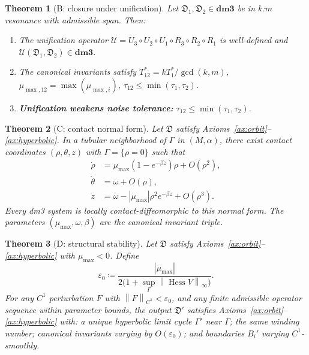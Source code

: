 \documentclass[12pt, oneside]{book}
\theoremstyle{plain}
\newtheorem{theorem}{Theorem}[section]
\theoremstyle{definition}
\theoremstyle{remark}
\newcommand{\dm}{\mathfrak{D}}
\newcommand{\dmcat}{\mathbf{dm3}}
\newcommand{\Orb}{\Gamma}
\newcommand{\cU}{\mathcal{U}}
\newcommand{\norm}[1]{\left\|#1\right\|}
\newcommand{\abs}[1]{\left|#1\right|}
\DeclareMathOperator{\Hess}{Hess}
\begin{document}
\begin{theorem}[B: closure under unification]\label{thm:B}
Let $\dm_1,\dm_2\in\dmcat$ be in $k$:$m$ resonance with admissible span.
Then:
\begin{enumerate}[label=\textup{(\roman*)}]
  \item The unification operator $\cU=U_3\circ U_2\circ U_1\circ R_3\circ R_2\circ R_1$
        is well-defined and $\cU(\dm_1,\dm_2)\in\dmcat$.
  \item The canonical invariants satisfy
        $T^*_{12}=kT^*_1/\gcd(k,m)$,\;
        $\mu_{\max,12}=\max(\mu_{\max,i})$,\;
        $\tau_{12}\le\min(\tau_1,\tau_2)$.
  \item \textbf{Unification weakens noise tolerance:}
        $\tau_{12}\le\min(\tau_1,\tau_2)$.
\end{enumerate}
\end{theorem}

\begin{theorem}[C: contact normal form]\label{thm:C}
Let $\dm$ satisfy Axioms~\ref{ax:orbit}--\ref{ax:hyperbolic}. In a tubular
neighborhood of $\Orb$ in $(M,\alpha)$, there exist contact coordinates
$(\rho,\theta,z)$ with $\Orb=\{\rho=0\}$ such that
\begin{align*}
  \dot\rho &= \mu_{\max}(1-e^{-\beta z})\rho + O(\rho^2),\\
  \dot\theta &= \omega + O(\rho),\\
  \dot z &= \omega - \abs{\mu_{\max}}\rho^2 e^{-\beta z} + O(\rho^3).
\end{align*}
Every dm3 system is locally contact-diffeomorphic to this normal form.
The parameters $(\mu_{\max},\omega,\beta)$ are the canonical invariant
triple.
\end{theorem}

\begin{theorem}[D: structural stability]\label{thm:D}
Let $\dm$ satisfy Axioms~\ref{ax:orbit}--\ref{ax:hyperbolic} with
$\mu_{\max}<0$. Define
\[
  \varepsilon_0 \coloneqq
  \frac{\abs{\mu_{\max}}}{2\bigl(1+\sup_{\Orb}\norm{\Hess V}_\infty\bigr)}.
\]
For any $C^1$ perturbation $F$ with $\norm{F}_{C^1}<\varepsilon_0$, and
any finite admissible operator sequence within parameter bounds, the output
$\dm'$ satisfies Axioms~\ref{ax:orbit}--\ref{ax:hyperbolic} with: a unique
hyperbolic limit cycle $\Orb'$ near $\Orb$; the same winding number;
canonical invariants varying by $O(\varepsilon_0)$; and boundaries $B_i'$
varying $C^1$-smoothly.
\end{theorem}
\end{document}
